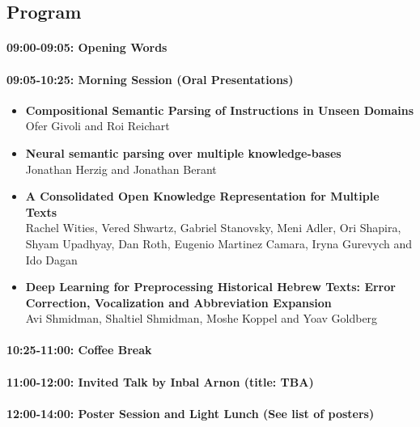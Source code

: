 \documentclass[a0,portrait]{a0poster}
\begin{document}
\subsection*{Program}\label{program}

\paragraph{09:00-09:05: Opening Words}\label{opening-words}

\paragraph{09:05-10:25: Morning Session (Oral
Presentations)}\label{morning-session-oral-presentations}

\begin{itemize}
\item
  \textbf{Compositional Semantic Parsing of Instructions in Unseen
  Domains}\\
  Ofer Givoli and Roi Reichart
\item
  \textbf{Neural semantic parsing over multiple knowledge-bases}\\
  Jonathan Herzig and Jonathan Berant
\item
  \textbf{A Consolidated Open Knowledge Representation for Multiple
  Texts}\\
  Rachel Wities, Vered Shwartz, Gabriel Stanovsky, Meni Adler, Ori
  Shapira, Shyam Upadhyay, Dan Roth, Eugenio Martinez Camara, Iryna
  Gurevych and Ido Dagan
\item
  \textbf{Deep Learning for Preprocessing Historical Hebrew Texts: Error
  Correction, Vocalization and Abbreviation Expansion}\\
  Avi Shmidman, Shaltiel Shmidman, Moshe Koppel and Yoav Goldberg
\end{itemize}

\paragraph{10:25-11:00: Coffee Break}\label{coffee-break}

\paragraph{11:00-12:00: Invited Talk by Inbal Arnon (title:
TBA)}\label{invited-talk-by-inbal-arnon-title-tba}

\paragraph{12:00-14:00: Poster Session and Light Lunch (See list of posters)}\label{poster-session-and-light-lunch-see-list-of-posters}
\end{document}
